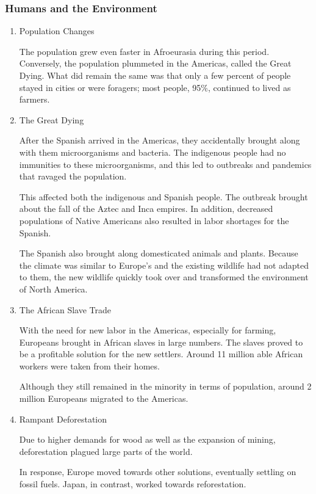 \documentclass[11pt]{article}
\begin{document}
\subsubsection{Humans and the Environment}
\label{sec:org94a3399}
\begin{enumerate}
\item Population Changes
\label{sec:orga0de179}

The population grew even faster in Afroeurasia during this period. Conversely, the population plummeted in the Americas, called the Great Dying. What did remain the same was that only a few percent of people stayed in cities or were foragers; most people, 95\%, continued to lived as farmers.

\item The Great Dying
\label{sec:orgbb8b2f4}

After the Spanish arrived in the Americas, they accidentally brought along with them microorganisms and bacteria. The indigenous people had no immunities to these microorganisms, and this led to outbreaks and pandemics that ravaged the population.

This affected both the indigenous and Spanish people. The outbreak brought about the fall of the Aztec and Inca empires. In addition, decreased populations of Native Americans also resulted in labor shortages for the Spanish.

The Spanish also brought along domesticated animals and plants. Because the climate was similar to Europe's and the existing wildlife had not adapted to them, the new wildlife quickly took over and transformed the environment of North America.

\item The African Slave Trade
\label{sec:orgd8d08db}

With the need for new labor in the Americas, especially for farming, Europeans brought in African slaves in large numbers. The slaves proved to be a profitable solution for the new settlers. Around 11 million able African workers were taken from their homes.

Although they still remained in the minority in terms of population, around 2 million Europeans migrated to the Americas.

\item Rampant Deforestation
\label{sec:orgbb6ad81}

Due to higher demands for wood as well as the expansion of mining, deforestation plagued large parts of the world.

In response, Europe moved towards other solutions, eventually settling on fossil fuels. Japan, in contrast, worked towards reforestation.
\end{enumerate}
\end{document}

